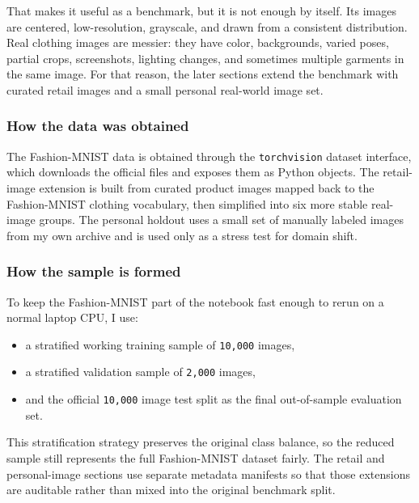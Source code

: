 \documentclass[11pt]{article}
\providecommand{\tightlist}{%
      \setlength{\itemsep}{0pt}\setlength{\parskip}{0pt}}
\begin{document}
That makes it useful as a benchmark, but it is not enough by itself. Its
images are centered, low-resolution, grayscale, and drawn from a
consistent distribution. Real clothing images are messier: they have
color, backgrounds, varied poses, partial crops, screenshots, lighting
changes, and sometimes multiple garments in the same image. For that
reason, the later sections extend the benchmark with curated retail
images and a small personal real-world image set.

\subsubsection{How the data was
obtained}\label{how-the-data-was-obtained}

The Fashion-MNIST data is obtained through the \texttt{torchvision}
dataset interface, which downloads the official files and exposes them
as Python objects. The retail-image extension is built from curated
product images mapped back to the Fashion-MNIST clothing vocabulary,
then simplified into six more stable real-image groups. The personal
holdout uses a small set of manually labeled images from my own archive
and is used only as a stress test for domain shift.

\subsubsection{How the sample is formed}\label{how-the-sample-is-formed}

To keep the Fashion-MNIST part of the notebook fast enough to rerun on a
normal laptop CPU, I use:

\begin{itemize}
\tightlist
\item
  a stratified working training sample of \texttt{10,000} images,
\item
  a stratified validation sample of \texttt{2,000} images,
\item
  and the official \texttt{10,000} image test split as the final
  out-of-sample evaluation set.
\end{itemize}

This stratification strategy preserves the original class balance, so
the reduced sample still represents the full Fashion-MNIST dataset
fairly. The retail and personal-image sections use separate metadata
manifests so that those extensions are auditable rather than mixed into
the original benchmark split.
\end{document}
